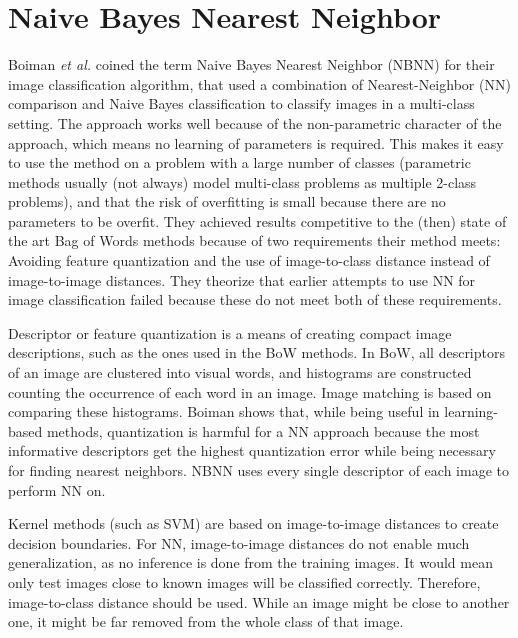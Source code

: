 \documentclass[a4paper,10pt]{article}
\begin{document}
\section{Naive Bayes Nearest Neighbor} %
\label{sec:naive_bayes_nearest_neighbor}
Boiman \emph{et al.} \cite{boiman2008defense} coined the term Naive Bayes Nearest Neighbor (NBNN) for their image classification algorithm, that used a combination of Nearest-Neighbor (NN) comparison and Naive Bayes classification to classify images in a multi-class setting. The approach works well because of the non-parametric character of the approach, which means no learning of parameters is required. This makes it easy to use the method on a problem with a large number of classes (parametric methods usually (not always) model multi-class problems as multiple 2-class problems), and that the risk of overfitting is small because there are no parameters to be overfit. They achieved results competitive to the (then) state of the art Bag of Words methods because of two requirements their method meets: Avoiding feature quantization and the use of image-to-class distance instead of image-to-image distances. They theorize that earlier attempts to use NN  for image classification failed because these do not meet both of these requirements.

Descriptor or feature quantization is a means of creating compact image descriptions, such as the ones used in the BoW methods. In BoW, all descriptors of an image are clustered into visual words, and histograms are constructed counting the occurrence of each word in an image. Image matching is based on comparing these histograms. Boiman shows that, while being useful in learning-based methods, quantization is harmful for a NN approach because the most informative descriptors get the highest quantization error while being necessary for finding nearest neighbors. NBNN uses every single descriptor of each image to perform NN on.

Kernel methods (such as SVM) are based on image-to-image distances to create decision boundaries. For NN, image-to-image distances do not enable much generalization, as no inference is done from the training images. It would mean only test images close to known images will be classified correctly. Therefore, image-to-class distance should be used. While an image might be close to another one, it might be far removed from the whole class of that image. \cite{wang2009learning}
\end{document}
